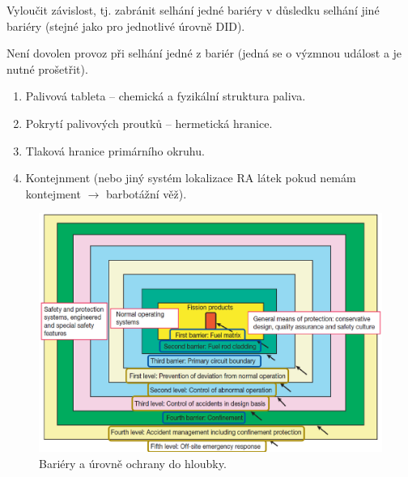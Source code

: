 Vyloučit závislost, tj. zabránit selhání jedné bariéry v důsledku selhání jiné bariéry (stejné jako pro jednotlivé úrovně DID).

Není dovolen provoz při selhání jedné z bariér (jedná se o výzmnou událost a je nutné prošetřit).

\begin{enumerate}
	\item Palivová tableta -- chemická a fyzikální struktura paliva.
	\item Pokrytí palivových proutků -- hermetická hranice.
	\item Tlaková hranice primárního okruhu.
	\item Kontejnment (nebo jiný systém lokalizace RA látek pokud nemám kontejment $\rightarrow$ barbotážní věž).
\end{enumerate}

\begin{figure}[h!]
    \centering
    \includegraphics[width=\textwidth]{img/DiD-bariery.png}
    \caption{Bariéry a úrovně ochrany do hloubky.}
\end{figure}